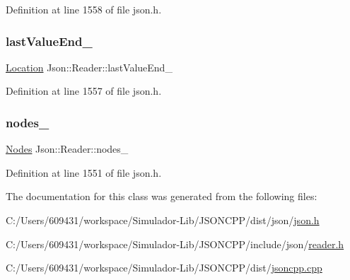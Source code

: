 Definition at line 1558 of file json.\+h.

\hypertarget{class_json_1_1_reader_a497a114f7b760f1b794b8fff9876615a}{}\label{class_json_1_1_reader_a497a114f7b760f1b794b8fff9876615a} 
\subsubsection{\texorpdfstring{last\+Value\+End\+\_\+}{lastValueEnd\_}}
{\footnotesize\ttfamily \hyperlink{class_json_1_1_reader_a46795b5b272bf79a7730e406cb96375a}{Location} Json\+::\+Reader\+::last\+Value\+End\+\_\+\hspace{0.3cm}{\ttfamily [private]}}



Definition at line 1557 of file json.\+h.

\hypertarget{class_json_1_1_reader_ada3d2c47699dad662e6d156c8c78a6ac}{}\label{class_json_1_1_reader_ada3d2c47699dad662e6d156c8c78a6ac} 
\subsubsection{\texorpdfstring{nodes\+\_\+}{nodes\_}}
{\footnotesize\ttfamily \hyperlink{class_json_1_1_reader_a8da2114fe8b8124d41ea2f3434f0171b}{Nodes} Json\+::\+Reader\+::nodes\+\_\+\hspace{0.3cm}{\ttfamily [private]}}



Definition at line 1551 of file json.\+h.



The documentation for this class was generated from the following files\+:\begin{DoxyCompactItemize}
\item 
C\+:/\+Users/609431/workspace/\+Simulador-\/\+Lib/\+J\+S\+O\+N\+C\+P\+P/dist/json/\hyperlink{dist_2json_2json_8h}{json.\+h}\item 
C\+:/\+Users/609431/workspace/\+Simulador-\/\+Lib/\+J\+S\+O\+N\+C\+P\+P/include/json/\hyperlink{reader_8h}{reader.\+h}\item 
C\+:/\+Users/609431/workspace/\+Simulador-\/\+Lib/\+J\+S\+O\+N\+C\+P\+P/dist/\hyperlink{jsoncpp_8cpp}{jsoncpp.\+cpp}\end{DoxyCompactItemize}
